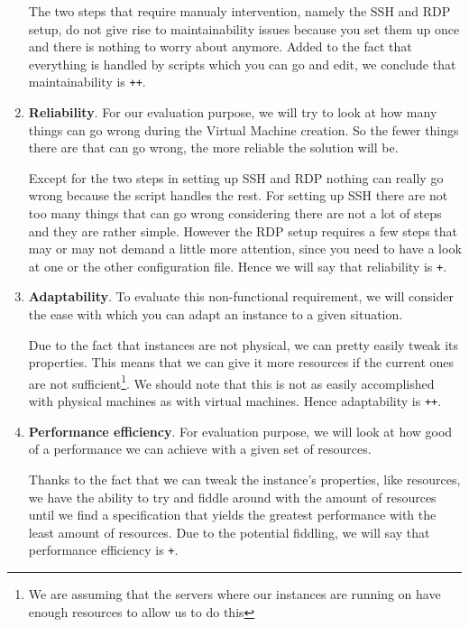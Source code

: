 \begin{enumerate}
	The two steps that require manualy intervention, namely the SSH
	and RDP setup, do not give rise to maintainability issues because
	you set them up once and there is nothing to worry about anymore.
	Added to the fact that everything is handled by scripts which you
	can go and edit, we conclude that maintainability is \verb|++|.

	\item \textbf{Reliability}.  For our evaluation
	purpose, we will try to look at how many things can go wrong
	during the Virtual Machine creation. So the fewer things there are
	that can go wrong, the more reliable the solution will be.

	Except for the two steps in setting up SSH and RDP nothing can
	really go wrong because the script handles the rest. For setting
	up SSH there are not too many things that can go wrong considering
	there are not a lot of steps and they are rather simple. However
	the RDP setup requires a few steps that may or may not demand a
	little more attention, since you need to have a look at one or the
	other configuration file. Hence we will say that reliability is
	\verb|+|.

	\item \textbf{Adaptability}. To evaluate this non-functional
	requirement, we will consider the ease with which you can adapt an
	instance to a given situation.
	
	Due to the fact that instances are not physical, we can pretty
	easily tweak its properties. This means that we can give it more
	resources if the current ones are not sufficient\footnote{We are
	assuming that the servers where our instances are running on have
	enough resources to allow us to do this}. We should note that this
	is not as easily accomplished with physical machines as with
	virtual machines. Hence adaptability is \verb|++|.

	\item \textbf{Performance efficiency}. For evaluation purpose, we
	will look at how good of a performance we can achieve with a given
	set of resources.

	Thanks to the fact that we can tweak the instance's properties, like
	resources, we have the ability to try and fiddle around with the
	amount of resources until we find a specification that yields the
	greatest performance with the least amount of resources. Due to
	the potential fiddling, we will say that performance efficiency is
	\verb|+|.

\end{enumerate}

